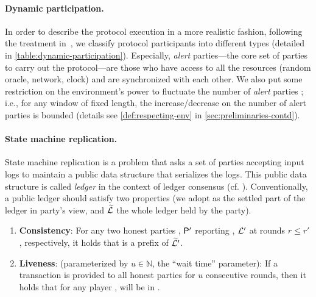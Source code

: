 \paragraph{Dynamic participation.}
%
In order to describe the protocol execution in a more realistic fashion, following the treatment in~\cite{CCS:BGKRZ18}, we classify protocol participants into different types (detailed in \cref{table:dynamic-participation}).
%
Especially, \emph{alert} parties---the core set of parties to carry out the protocol---are those who have access to all the resources (random oracle, network, clock) and are synchronized with each other.
%
We also put some restriction on the environment's power to fluctuate the number of \emph{alert} parties \cite{C:GarKiaLeo17,EPRINT:GarKiaLeo20}; i.e., for any window of fixed length, the increase/decrease on the number of alert parties is bounded (details see \cref{def:respecting-env} in \cref{sec:preliminaries-contd}).

\paragraph{State machine replication.}
%
State machine replication \cite{CSUR:Schneider90} is a problem that asks a set of parties accepting input logs to maintain a public data structure that serializes the logs.
%
This public data structure is called \emph{ledger} in the context of ledger consensus (cf. \cite{EC:GarKiaLeo15,RSA:GarKia20}).
%
Conventionally, a public ledger should satisfy two properties (we adopt \ledger as the settled part of the ledger in party's view, and $\widetilde{\mathcal{L}}$ the whole ledger held by the party).
%
\begin{enumerate}[label=\FlatSteel, leftmargin=*, noitemsep]
    \item \textbf{Consistency}: For any two honest parties \party, $\mathsf{P}'$ reporting \ledger, $\mathcal{L}'$ at rounds $r \le r'$, respectively, it holds that \ledger is a prefix of $\widetilde{\mathcal{L}'}$.
    
    \item \textbf{Liveness}: (parameterized by $u \in \mathbb{N}$, the ``wait time'' parameter): If a transaction \tx is provided to all honest parties for $u$ consecutive rounds, then it holds that for any player \party, \tx will be in \ledger.
\end{enumerate}
